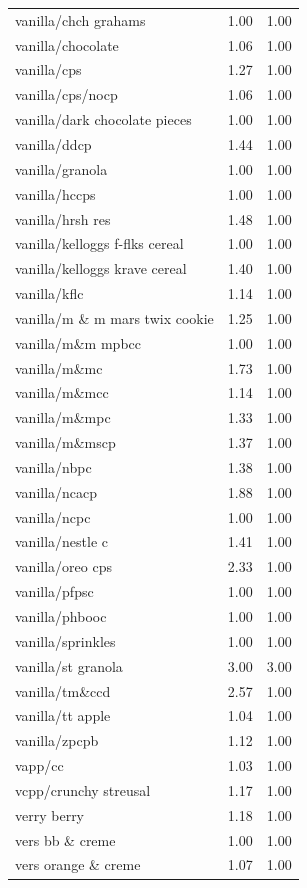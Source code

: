 \begin{table}
\begin{tabular}{lrr}
vanilla/chch grahams & 1.00 & 1.00 \\
vanilla/chocolate & 1.06 & 1.00 \\
vanilla/cps & 1.27 & 1.00 \\
vanilla/cps/nocp & 1.06 & 1.00 \\
vanilla/dark chocolate pieces & 1.00 & 1.00 \\
vanilla/ddcp & 1.44 & 1.00 \\
vanilla/granola & 1.00 & 1.00 \\
vanilla/hccps & 1.00 & 1.00 \\
vanilla/hrsh res & 1.48 & 1.00 \\
vanilla/kelloggs f-flks cereal & 1.00 & 1.00 \\
vanilla/kelloggs krave cereal & 1.40 & 1.00 \\
vanilla/kflc & 1.14 & 1.00 \\
vanilla/m \& m mars twix cookie & 1.25 & 1.00 \\
vanilla/m\&m mpbcc & 1.00 & 1.00 \\
vanilla/m\&mc & 1.73 & 1.00 \\
vanilla/m\&mcc & 1.14 & 1.00 \\
vanilla/m\&mpc & 1.33 & 1.00 \\
vanilla/m\&mscp & 1.37 & 1.00 \\
vanilla/nbpc & 1.38 & 1.00 \\
vanilla/ncacp & 1.88 & 1.00 \\
vanilla/ncpc & 1.00 & 1.00 \\
vanilla/nestle c & 1.41 & 1.00 \\
vanilla/oreo cps & 2.33 & 1.00 \\
vanilla/pfpsc & 1.00 & 1.00 \\
vanilla/phbooc & 1.00 & 1.00 \\
vanilla/sprinkles & 1.00 & 1.00 \\
vanilla/st granola & 3.00 & 3.00 \\
vanilla/tm\&ccd & 2.57 & 1.00 \\
vanilla/tt apple & 1.04 & 1.00 \\
vanilla/zpcpb & 1.12 & 1.00 \\
vapp/cc & 1.03 & 1.00 \\
vcpp/crunchy streusal & 1.17 & 1.00 \\
verry berry & 1.18 & 1.00 \\
vers bb \& creme & 1.00 & 1.00 \\
vers orange \& creme & 1.07 & 1.00 \\

\end{tabular}
\end{table}
